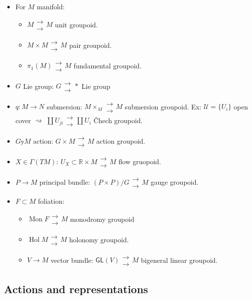 \begin{example}\leavevmode
\begin{itemize}
\item For \(M\) manifold:
\begin{itemize}
\item \(M\substack{\to\\\to}M\) unit groupoid.
\item \(M \times M \substack{\to\\\to} M\) pair groupoid.
\item \(\pi_{1}(M)\substack{\to\\\to}M\) fundamental groupoid.
\end{itemize}
\item \(G\) Lie group: \(G \substack{\to\\\to} *\) Lie group

\item \(q:M \to N\) submersion: \(M \times_M \substack{\to\\\to}M\) submersion groupoid. Ex: \(\mathcal{U}=\{U_i\}\) open cover \(\rightsquigarrow \) \(\coprod U_{ji}\substack{\to\\\to}\coprod U_i\) \v Chech groupoid.
\item \(G \mathbb{y} M\) action:  \(G \times M \substack{\to\\\to}M\) action groupoid.
\item \(X \in \Gamma(TM)\): \(U_X \subset \mathbb{R}\times M \substack{\to\\\to}M\) flow gruopoid.
\item \(P \to M\) principal bundle: \((P\times P)/G \substack{\to\\\to}M\) gauge groupoid.
\item  \(F \subset M\) foliation:
	\begin{itemize}
	\item \(\operatorname{Mon}F \substack{\to\\\to} M\) monodromy groupoid
	\item \(\operatorname{Hol}M \substack{\to\\\to} M\) holonomy groupoid.
\item \(V \to M\) vector bundle: \(\mathsf{GL}(V)\substack{\to\\\to}M\) bigeneral linear groupoid.
	\end{itemize}
\end{itemize}
\end{example}

\subsection{Actions and representations}


